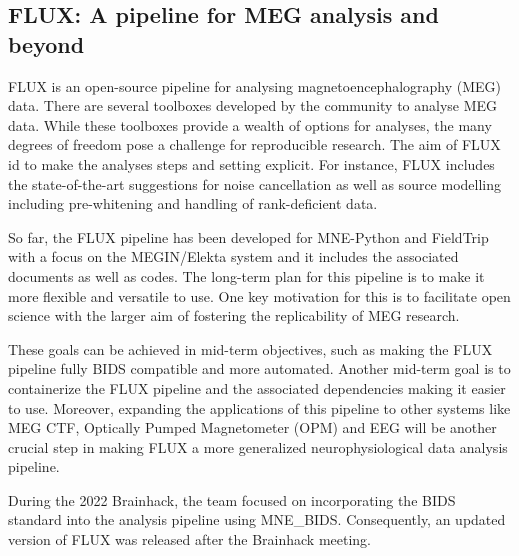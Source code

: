 \documentclass[../main.tex]{subfiles}
\begin{document}
\subsection{FLUX: A pipeline for MEG analysis and beyond}


FLUX\citep{Ferrante2022} is an open-source pipeline for analysing magnetoencephalography (MEG) data. There are several toolboxes developed by the community to analyse MEG data. While these toolboxes provide a wealth of options for analyses, the many degrees of freedom pose a challenge for reproducible research. The aim of FLUX id to make the analyses steps and setting explicit. For instance, FLUX includes the state-of-the-art suggestions for noise cancellation as well as source modelling including pre-whitening and handling of rank-deficient data.

So far, the FLUX pipeline has been developed for MNE-Python\citep{Gramfort2014} and FieldTrip\citep{Oostenveld2011} with a focus on the MEGIN/Elekta system and it includes the associated documents as well as codes.
The long-term plan for this pipeline is to make it more flexible and versatile to use. One key motivation for this is to facilitate open science with the larger aim of fostering the replicability of MEG research.

These goals can be achieved in mid-term objectives, such as making the FLUX pipeline fully BIDS compatible and more automated. Another mid-term goal is to containerize the FLUX pipeline and the associated dependencies making it easier to use. Moreover, expanding the applications of this pipeline to other systems like MEG CTF, Optically Pumped Magnetometer (OPM) and EEG will be another crucial step in making FLUX a more generalized neurophysiological data analysis pipeline.

During the 2022 Brainhack, the team focused on incorporating the BIDS standard into the analysis pipeline using MNE_BIDS\citep{Appelhoff2019}. Consequently, an updated version of FLUX was released after the Brainhack meeting.
\end{document}
